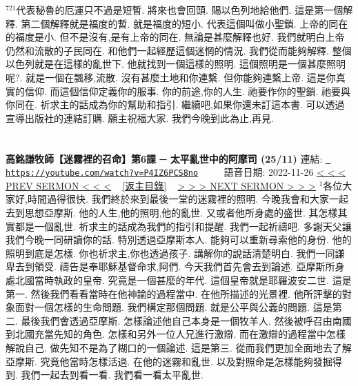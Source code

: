 \documentclass{book}
\begin{document}
$^{721}$代表秘魯的厄運只不過是短暫.
將來也會回頭.
賜以色列地給他們.
這是第一個解釋.
第二個解釋就是福度的暫.
就是福度的短小.
代表這個叫做小聖鎖.
上帝的同在的福度是小.
但不是沒有,是有上帝的同在.
無論是甚麼解釋也好.
我們就明白上帝仍然和流散的子民同在.
和他們一起經歷這個迷惘的情況.
我們從而能夠解釋.
整個以色列就是在這樣的亂世下.
他就找到一個這樣的照明.
這個照明是一個甚麼照明呢?.
就是一個在飄移,流散.
沒有甚麼土地和你連繫.
但你能夠連繫上帝.
這是你真實的信仰.
而這個信仰定義你的服事.
你的前途,你的人生.
祂要作你的聖鎖.
祂要與你同在.
祈求主的話成為你的幫助和指引.
繼續吧,如果你還未訂這本書.
可以透過宣導出版社的連結訂購.
願主祝福大家.
我們今晚到此為止,再見.
\newpage



\section{}
\label{sec:P4IZ6PCS8no}
\textbf{高銘謙牧師【迷霧裡的召命】第6課 ─ 太平亂世中的阿摩司 (25/11)}
\newline
\newline
連結: \href{https://youtube.com/watch?v=P4IZ6PCS8no}{\texttt{ https://youtube.com/watch?v=P4IZ6PCS8no}} ~~~~ 語音日期: 2022-11-26 
\newline
\newline
\hyperref[sec:FHx_k0UyGMs]{\small{< < < PREV SERMON < < <}}
~
\hyperref[sec:index]{\small{[返主目錄]}}
~
\hyperref[sec:Hhm2a_HII7A]{\small{> > > NEXT SERMON > > >}}
\newline
\newline
$^{1}$各位大家好,時間過得很快.
我們終於來到最後一堂的迷霧裡的照明.
今晚我會和大家一起去到思想亞摩斯.
他的人生,他的照明,他的亂世.
又或者他所身處的盛世.
其怎樣其實都是一個亂世.
祈求主的話成為我們的指引和提醒.
我們一起祈禱吧.
多謝天父讓我們今晚一同研讀你的話.
特別透過亞摩斯本人.
能夠可以重新尋索他的身份.
他的照明到底是怎樣.
你也祈求主,你也透過孩子.
講解你的說話清楚明白.
我們一同謙卑去到領受.
禱告是奉耶穌基督命求,阿們.
今天我們首先會去到論述.
亞摩斯所身處北國當時執政的皇帝.
究竟是一個甚麼的年代.
這個皇帝就是耶羅波安二世.
這是第一.
然後我們看看當時在他神諭的過程當中.
在他所描述的光景裡.
他所評擊的對象面對一個怎樣的生命問題.
我們構定那個問題.
就是公平與公義的問題.
這是第二.
最後我們會透過亞摩斯.
怎樣論述他自己本身是一個牧羊人.
然後被呼召由南國到北國充當先知的角色.
怎樣和另外一位人兄進行激辯.
而在激辯的過程當中怎樣解說自己.
做先知不是為了糊口的一個論述.
這是第三.
從而我們更加全面地去了解亞摩斯.
究竟他當時怎樣活過.
在他的迷霧和亂世.
以及對照命是怎樣能夠發掘得到.
我們一起去到看一看.
我們看一看太平亂世.
\end{document}
